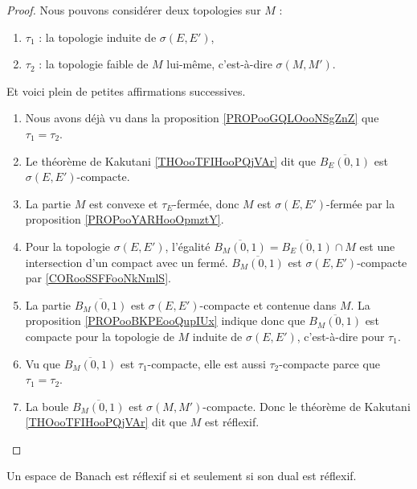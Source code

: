 \begin{proof}
	Nous pouvons considérer deux topologies sur \( M\) :
	\begin{enumerate}
		\item
		      \( \tau_1\) : la topologie induite de \( \sigma(E,E')\),
		\item
		      \( \tau_2\) : la topologie faible de \( M\) lui-même, c'est-à-dire \( \sigma(M,M')\).
	\end{enumerate}

	Et voici plein de petites affirmations successives.
	\begin{enumerate}
		\item
		      Nous avons déjà vu dans la proposition \ref{PROPooGQLOooNSgZnZ} que \( \tau_1=\tau_2\).
		\item
		      Le théorème de Kakutani \ref{THOooTFIHooPQjVAr} dit que \( \overline{B_E(0,1)}\) est \( \sigma(E,E')\)-compacte.
		\item
		      La partie \( M\) est convexe et \( \tau_E\)-fermée, donc \( M\) est \( \sigma(E,E')\)-fermée par la proposition \ref{PROPooYARHooOpmztY}.
		\item
		      Pour la topologie \( \sigma(E,E')\), l'égalité \( \overline{B_M(0,1)}=\overline{B_E(0,1)}\cap M\) est une intersection d'un compact avec un fermé. \( \overline{B_M(0,1)}\) est \( \sigma(E,E')\)-compacte par \ref{CORooSSFFooNkNmlS}.
		\item
		      La partie \( \overline{B_M(0,1)}\) est \( \sigma(E,E')\)-compacte et contenue dans \( M\). La proposition \ref{PROPooBKPEooQupIUx} indique donc que \( \overline{B_M(0,1)}\) est compacte pour la topologie de \( M\) induite de \( \sigma(E,E')\), c'est-à-dire pour \( \tau_1\).
		\item
		      Vu que \(  \overline{B_M(0,1)}  \) est \( \tau_1\)-compacte, elle est aussi \( \tau_2\)-compacte parce que \( \tau_1=\tau_2\).
		\item
		      La boule \( \overline{B_M(0,1)}\) est \( \sigma(M,M')\)-compacte. Donc le théorème de Kakutani \ref{THOooTFIHooPQjVAr} dit que \( M\) est réflexif.
	\end{enumerate}

\end{proof}

\begin{proposition}       \label{PROPooBBNBooGcXDRH}
	Un espace de Banach est réflexif si et seulement si son dual est réflexif.
\end{proposition}


